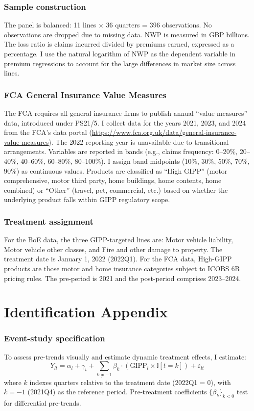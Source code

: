 \documentclass[12pt]{article}
\newcommand{\ind}{\mathbb{I}}
\begin{document}
\subsubsection*{Sample construction} The panel is balanced: 11 lines $\times$ 36 quarters = 396 observations. No observations are dropped due to missing data. NWP is measured in GBP billions. The loss ratio is claims incurred divided by premiums earned, expressed as a percentage. I use the natural logarithm of NWP as the dependent variable in premium regressions to account for the large differences in market size across lines.

\subsubsection*{FCA General Insurance Value Measures} The FCA requires all general insurance firms to publish annual ``value measures'' data, introduced under PS21/5. I collect data for the years 2021, 2023, and 2024 from the FCA's data portal (\url{https://www.fca.org.uk/data/general-insurance-value-measures}). The 2022 reporting year is unavailable due to transitional arrangements. Variables are reported in bands (e.g., claims frequency: 0--20\%, 20--40\%, 40--60\%, 60--80\%, 80--100\%). I assign band midpoints (10\%, 30\%, 50\%, 70\%, 90\%) as continuous values. Products are classified as ``High GIPP'' (motor comprehensive, motor third party, home buildings, home contents, home combined) or ``Other'' (travel, pet, commercial, etc.) based on whether the underlying product falls within GIPP regulatory scope.

\subsubsection*{Treatment assignment} For the BoE data, the three GIPP-targeted lines are: Motor vehicle liability, Motor vehicle other classes, and Fire and other damage to property. The treatment date is January 1, 2022 (2022Q1). For the FCA data, High-GIPP products are those motor and home insurance categories subject to ICOBS 6B pricing rules. The pre-period is 2021 and the post-period comprises 2023--2024.

\section{Identification Appendix}
\label{sec:app_id}

\subsubsection*{Event-study specification} To assess pre-trends visually and estimate dynamic treatment effects, I estimate:
\begin{equation}
Y_{lt} = \alpha_l + \gamma_t + \sum_{k \neq -1} \beta_k \cdot (\text{GIPP}_l \times \ind[t = k]) + \varepsilon_{lt}
\end{equation}
where $k$ indexes quarters relative to the treatment date (2022Q1 = 0), with $k = -1$ (2021Q4) as the reference period. Pre-treatment coefficients $\{\beta_k\}_{k < 0}$ test for differential pre-trends.
\end{document}
